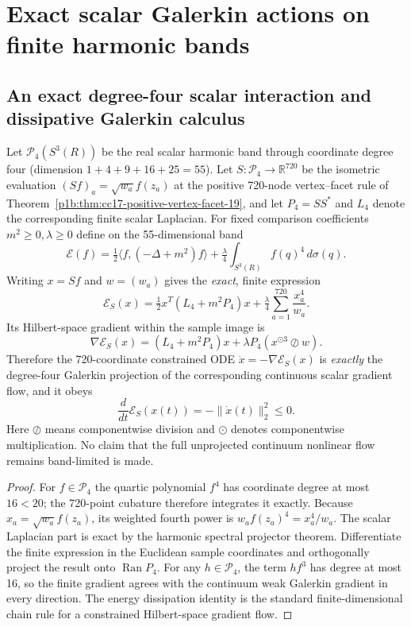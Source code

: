 \documentclass[12pt,a4paper]{article}
\begin{document}
\section{Exact scalar Galerkin actions on finite harmonic bands}


\subsection{An exact degree-four scalar interaction and dissipative Galerkin calculus}
\label{p3b:sec:cc17-720-quartic-compiler}
\begin{theorem}
\label{p3b:thm:cc17-exact-scalar-quartic-galerkin}
Let $\mathcal P_4(S^3(R))$ be the real scalar harmonic band through
coordinate degree four (dimension $1+4+9+16+25=55$).
Let $S:\mathcal P_4\to\mathbb R^{720}$ be the isometric evaluation
$(Sf)_a=\sqrt{w_a}f(z_a)$ at the positive 720-node
vertex--facet rule of Theorem~\ref{p1b:thm:cc17-positive-vertex-facet-19},
and let $P_4=SS^*$ and $L_4$ denote the corresponding finite scalar
Laplacian. For fixed comparison coefficients $m^2\ge0,\lambda\ge0$
define on the 55-dimensional band
\[
 \mathcal E(f)=\tfrac12\langle f,(-\Delta+m^2)f\rangle
      +\tfrac\lambda4\int_{S^3(R)}f(q)^4\,d\sigma(q).
\]
Writing $x=Sf$ and $w=(w_a)$ gives the \emph{exact}, finite expression
\[
\boxed{\mathcal E_S(x)=\tfrac12x^T(L_4+m^2P_4)x
    +\tfrac\lambda4\sum_{a=1}^{720}\frac{x_a^4}{w_a}.}
\]
Its Hilbert-space gradient within the sample image is
\[
\boxed{\nabla\mathcal E_S(x)=
    (L_4+m^2P_4)x+\lambda P_4(x^{\odot3}\oslash w).}
\]
Therefore the 720-coordinate constrained ODE
$\dot x=-\nabla\mathcal E_S(x)$ is \emph{exactly} the degree-four
Galerkin projection of the corresponding continuous scalar gradient
flow, and it obeys
\[\boxed{\frac{d}{dt}\mathcal E_S(x(t))
       =-\|\dot x(t)\|_2^2\le0.}\]
Here $\oslash$ means componentwise division and $\odot$ denotes
componentwise multiplication. No claim that the full unprojected
continuum nonlinear flow remains band-limited is made.
\end{theorem}
\begin{proof}
For $f\in\mathcal P_4$ the quartic polynomial $f^4$ has coordinate
degree at most $16<20$; the 720-point cubature therefore integrates
it exactly. Because $x_a=\sqrt{w_a}f(z_a)$, its weighted fourth
power is $w_af(z_a)^4=x_a^4/w_a$. The scalar Laplacian part is
exact by the harmonic spectral projector theorem.
Differentiate the finite expression in the Euclidean sample
coordinates and orthogonally project the result onto $\operatorname{Ran}P_4$.
For any $h\in\mathcal P_4$, the term $hf^3$ has degree at most 16,
so the finite gradient agrees with the continuum weak Galerkin
gradient in every direction. The energy dissipation identity is
the standard finite-dimensional chain rule for a constrained
Hilbert-space gradient flow.
\end{proof}
\end{document}
